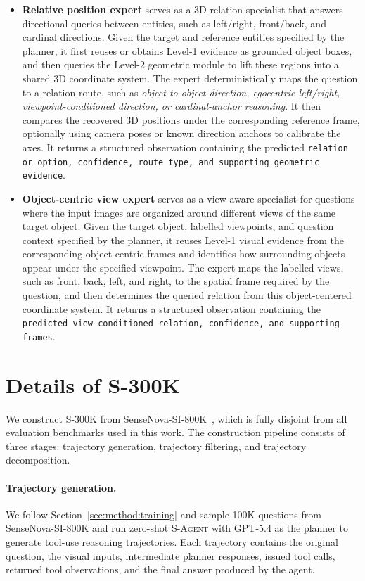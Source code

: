 \begin{itemize}
\item \textbf{Relative position expert} serves as a 3D relation specialist that answers directional queries between entities, such as left/right, front/back, and cardinal directions.
%
Given the target and reference entities specified by the planner, it first reuses or obtains Level-1 evidence as grounded object boxes, and then queries the Level-2 geometric module to lift these regions into a shared 3D coordinate system.
The expert deterministically maps the question to a relation route, such as \textit{object-to-object direction, egocentric left/right, viewpoint-conditioned direction, or cardinal-anchor reasoning}.
It then compares the recovered 3D positions under the corresponding reference frame, optionally using camera poses or known direction anchors to calibrate the axes.
It returns a structured observation containing the predicted \texttt{relation or option, confidence, route type, and supporting geometric evidence}.

\item \textbf{Object-centric view expert} serves as a view-aware specialist for questions where the input images are organized around different views of the same target object.
%
Given the target object, labelled viewpoints, and question context specified by the planner, it reuses Level-1 visual evidence from the corresponding object-centric frames and identifies how surrounding objects appear under the specified viewpoint.
The expert maps the labelled views, such as front, back, left, and right, to the spatial frame required by the question, and then determines the queried relation from this object-centered coordinate system.
It returns a structured observation containing the \texttt{predicted view-conditioned relation, confidence, and supporting frames}.
\end{itemize}


\section{Details of \textsc{S-300K}}
\label{app:training_data}

We construct \textsc{S-300K} from SenseNova-SI-800K~\citep{sensenova_si}, which is fully disjoint from all evaluation benchmarks used in this work. 
The construction pipeline consists of three stages: trajectory generation, trajectory filtering, and trajectory decomposition.

\paragraph{Trajectory generation.}
We follow Section~\ref{sec:method:training} and sample 100K questions from SenseNova-SI-800K and run zero-shot \textsc{S-Agent} with GPT-5.4 as the planner to generate tool-use reasoning trajectories. 
Each trajectory contains the original question, the visual inputs, intermediate planner responses, issued tool calls, returned tool observations, and the final answer produced by the agent.

